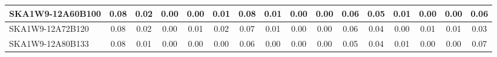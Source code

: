 \begin{table}[H]
{{\begin{tabular}{|lccccc||ccccc||ccccc|}
SKA1W9-12A60B100 & 0.08 \cellcolor{blue!60.00} & 0.02 \cellcolor{red!39.00} & 0.00 \cellcolor{green!18.00} & 0.00 \cellcolor{orange!18.00} & 0.01 \cellcolor{purple!39.00} & 0.08 \cellcolor{blue!60.00} & 0.01 \cellcolor{red!60.00} & 0.00 \cellcolor{green!18.00} & 0.00 \cellcolor{orange!18.00} & 0.06 \cellcolor{purple!60.00} & 0.05 \cellcolor{blue!39.00} & 0.01 \cellcolor{red!60.00} & 0.00 \cellcolor{green!18.00} & 0.00 \cellcolor{orange!18.00} & 0.06 \cellcolor{purple!43.20}\\ \hline 
SKA1W9-12A72B120 & 0.08 \cellcolor{blue!60.00} & 0.02 \cellcolor{red!39.00} & 0.00 \cellcolor{green!18.00} & 0.01 \cellcolor{orange!60.00} & 0.02 \cellcolor{purple!60.00} & 0.07 \cellcolor{blue!39.00} & 0.01 \cellcolor{red!60.00} & 0.00 \cellcolor{green!18.00} & 0.00 \cellcolor{orange!18.00} & 0.06 \cellcolor{purple!60.00} & 0.04 \cellcolor{blue!18.00} & 0.00 \cellcolor{red!18.00} & 0.01 \cellcolor{green!60.00} & 0.01 \cellcolor{orange!60.00} & 0.03 \cellcolor{purple!18.00}\\ \hline 
SKA1W9-12A80B133 & 0.08 \cellcolor{blue!60.00} & 0.01 \cellcolor{red!18.00} & 0.00 \cellcolor{green!18.00} & 0.00 \cellcolor{orange!18.00} & 0.00 \cellcolor{purple!18.00} & 0.06 \cellcolor{blue!18.00} & 0.00 \cellcolor{red!18.00} & 0.00 \cellcolor{green!18.00} & 0.00 \cellcolor{orange!18.00} & 0.05 \cellcolor{purple!46.00} & 0.04 \cellcolor{blue!18.00} & 0.01 \cellcolor{red!60.00} & 0.00 \cellcolor{green!18.00} & 0.00 \cellcolor{orange!18.00} & 0.07 \cellcolor{purple!51.60}\\ \hline 
\end{tabular}}
\vspace{-0.300000cm}
\hspace{1cm} 
}
\end{table}
